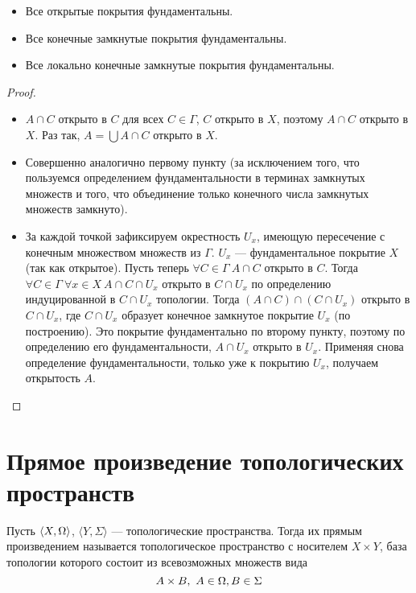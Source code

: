 \begin{theorem}
	\enewline
	\begin{itemize}
		\item Все открытые покрытия фундаментальны.
		\item Все конечные замкнутые покрытия фундаментальны.
		\item Все локально конечные замкнутые покрытия фундаментальны.
	\end{itemize}
\end{theorem}
\begin{proof}
	\enewline
	\begin{itemize}
		\item $A \cap C$ открыто в $C$ для всех $C \in \Gamma$, $C$ открыто в $X$,
			поэтому $A \cap C$ открыто в $X$. Раз так, $A = \bigcup{A \cap C}$
			открыто в $X$.
		\item Совершенно аналогично первому пункту (за исключением того, что
			пользуемся определением фундаментальности в терминах замкнутых множеств
			и того, что объединение только конечного числа замкнутых множеств замкнуто).
		\item За каждой точкой зафиксируем окрестность $U_x$, имеющую
			пересечение с конечным множеством множеств из $\Gamma$. $U_x$ ---
			фундаментальное покрытие $X$ (так как открытое). Пусть теперь
			$\forall C \in \Gamma~ A \cap C$ открыто в $C$. Тогда
			$\forall C \in \Gamma~ \forall x \in X~ A \cap C \cap U_x$ открыто в $C \cap U_x$
			по определению индуцированной в $C \cap U_x$ топологии. Тогда
			$(A \cap C) \cap (C \cap U_x)$ открыто в $C \cap U_x$, где
			$C \cap U_x$ образует конечное замкнутое покрытие $U_x$ (по построению). Это
			покрытие фундаментально по второму пункту, поэтому по определению его
			фундаментальности, $A \cap U_x$ открыто в $U_x$. Применяя снова
			определение фундаментальности, только уже к покрытию $U_x$, получаем открытость
			$A$.
	\end{itemize}
\end{proof}

\section{Прямое произведение топологических пространств}

\begin{definition}
	Пусть $\langle X, \Omega \rangle$, $\langle Y, \Sigma \rangle$ --- топологические
	пространства. Тогда их прямым произведением называется топологическое пространство
	с носителем $X \times Y$, база топологии которого состоит из всевозможных множеств
	вида
\[
	A \times B,~ A \in \Omega, B \in \Sigma
\]
\end{definition}

